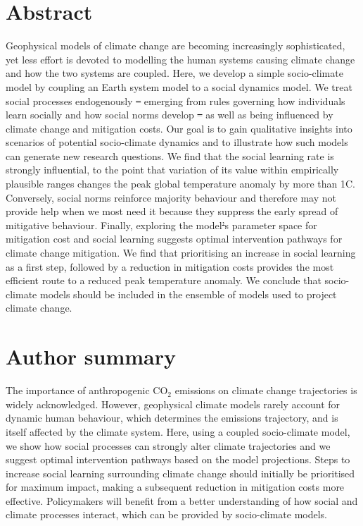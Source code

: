 \documentclass[10pt,letterpaper]{article}
\providecommand{\DIFaddtex}[1]{{\protect\color{blue}\uwave{#1}}} %
\providecommand{\DIFdeltex}[1]{{\protect\color{red}\sout{#1}}}                      %
\providecommand{\DIFaddbegin}{} %
\providecommand{\DIFaddend}{} %
\providecommand{\DIFdelbegin}{} %
\providecommand{\DIFdelend}{} %
\providecommand{\DIFadd}[1]{\texorpdfstring{\DIFaddtex{#1}}{#1}} %
\providecommand{\DIFdel}[1]{\texorpdfstring{\DIFdeltex{#1}}{}} %
\begin{document}
\section*{Abstract}
Geophysical models of climate change are becoming increasingly sophisticated, yet less effort is devoted to modelling the human systems causing climate change and how the two systems are coupled. Here, we develop a simple socio-climate model by coupling an Earth system model to a social dynamics model. We treat social processes endogenously \DIFdelbegin \DIFdel{– }\DIFdelend \DIFaddbegin \DIFadd{? }\DIFaddend emerging from rules governing how individuals learn socially and how social norms develop \DIFdelbegin \DIFdel{– }\DIFdelend \DIFaddbegin \DIFadd{? }\DIFaddend as well as being influenced by climate change and mitigation costs. Our goal is to gain qualitative insights into scenarios of potential socio-climate dynamics and to illustrate how such models can generate new research questions. We find that the social learning rate is strongly influential, to the point that variation of its value within empirically plausible ranges changes the peak global temperature anomaly by more than 1\degree C. Conversely, social norms reinforce majority behaviour and therefore may not provide help when we most need it because they suppress the early spread of mitigative behaviour. Finally, exploring the model\DIFdelbegin \DIFdel{’}\DIFdelend \DIFaddbegin \DIFadd{?}\DIFaddend s parameter space for mitigation cost and social learning suggests optimal intervention pathways for climate change mitigation. We find that prioritising an increase in social learning as a first step, followed by a reduction in mitigation costs provides the most efficient route to a reduced peak temperature anomaly. We conclude that socio-climate models should be included in the ensemble of models used to project climate change.


\section*{Author summary}
The importance of anthropogenic $\text{CO}_2$ emissions on climate change trajectories is widely acknowledged. However, geophysical climate models rarely account for dynamic human behaviour, which determines the emissions trajectory, and is itself affected by the climate system. Here, using a coupled socio-climate model, we show how social processes can strongly alter climate trajectories and we suggest optimal intervention pathways based on the model projections. Steps to increase social learning surrounding climate change should initially be prioritised for maximum impact, making a subsequent reduction in mitigation costs more effective. Policymakers will benefit from a better understanding of how social and climate processes interact, which can be provided by socio-climate models.
\end{document}
